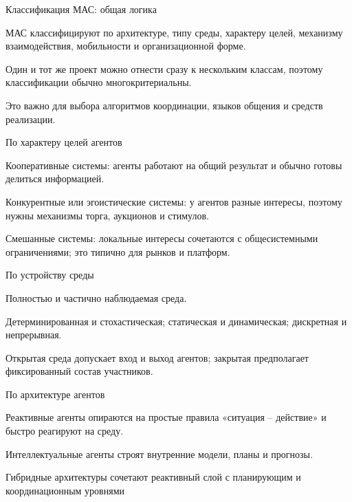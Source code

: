 \begin{frame}{Классификация МАС: общая логика}
	\topline
	\justifying
	\begin{textitemize}
		\item МАС классифицируют по архитектуре, типу среды, характеру целей, механизму взаимодействия, мобильности и организационной форме.
		\item Один и тот же проект можно отнести сразу к нескольким классам, поэтому классификации обычно многокритериальны.
		\item Это важно для выбора алгоритмов координации, языков общения и средств реализации.
	\end{textitemize}
\end{frame}

\begin{frame}{По характеру целей агентов}
	\topline
	\justifying
	\begin{textitemize}
		\item Кооперативные системы: агенты работают на общий результат и обычно готовы делиться информацией.
		\item Конкурентные или эгоистические системы: у агентов разные интересы, поэтому нужны механизмы торга, аукционов и стимулов.
		\item Смешанные системы: локальные интересы сочетаются с общесистемными ограничениями; это типично для рынков и платформ.
	\end{textitemize}
\end{frame}

\begin{frame}{По устройству среды}
	\topline
	\justifying
	\begin{textitemize}
		\item Полностью и частично наблюдаемая среда.
		\item Детерминированная и стохастическая; статическая и динамическая; дискретная и непрерывная.
		\item Открытая среда допускает вход и выход агентов; закрытая предполагает фиксированный состав участников.
	\end{textitemize}
\end{frame}

\begin{frame}{По архитектуре агентов}
	\topline
	\justifying
	\begin{textitemize}
		\item Реактивные агенты опираются на простые правила «ситуация -- действие» и быстро реагируют на среду.
		\item Интеллектуальные агенты строят внутренние модели, планы и прогнозы.
		\item Гибридные архитектуры сочетают реактивный слой с планирующим и координационным уровнями
	\end{textitemize}
\end{frame}

